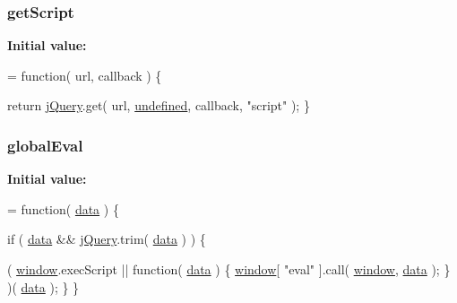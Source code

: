 \hypertarget{jquery-1_810_82-vsdoc_8js_abbf3713d0b4ae50a921583a6932e4c71}{
\subsubsection[{get\-Script}]{ get\-Script}}\label{jquery-1_810_82-vsdoc_8js_abbf3713d0b4ae50a921583a6932e4c71}
{\bfseries Initial value\-:}
\begin{DoxyCode}
= \textcolor{keyword}{function}( url, callback ) \{


        \textcolor{keywordflow}{return} \hyperlink{jquery-1_810_82-vsdoc_8js_add5237586d970a38a81f990e8eb28c6c}{jQuery}.get( url, \hyperlink{jquery-1_810_82-vsdoc_8js_a08113a236cc18d2a9d5ce27e638012be}{undefined}, callback, \textcolor{stringliteral}{"script"} );
    \}
\end{DoxyCode}
\hypertarget{jquery-1_810_82-vsdoc_8js_a898e1e411825feebc0c78978f2a2a140}{
\subsubsection[{global\-Eval}]{ global\-Eval}}\label{jquery-1_810_82-vsdoc_8js_a898e1e411825feebc0c78978f2a2a140}
{\bfseries Initial value\-:}
\begin{DoxyCode}
= \textcolor{keyword}{function}( \hyperlink{jquery-1_810_82-vsdoc_8js_a609407b3456fdc3c5671a9fc4a226ff7}{data} ) \{


        \textcolor{keywordflow}{if} ( \hyperlink{jquery-1_810_82-vsdoc_8js_a609407b3456fdc3c5671a9fc4a226ff7}{data} && \hyperlink{jquery-1_810_82-vsdoc_8js_add5237586d970a38a81f990e8eb28c6c}{jQuery}.trim( \hyperlink{jquery-1_810_82-vsdoc_8js_a609407b3456fdc3c5671a9fc4a226ff7}{data} ) ) \{
            
            
            
            ( \hyperlink{jquery-1_810_82-vsdoc_8js_a04a8a2bbfa9c15500892b8e5033d625b}{window}.execScript || \textcolor{keyword}{function}( \hyperlink{jquery-1_810_82-vsdoc_8js_a609407b3456fdc3c5671a9fc4a226ff7}{data} ) \{
                \hyperlink{jquery-1_810_82-vsdoc_8js_a04a8a2bbfa9c15500892b8e5033d625b}{window}[ \textcolor{stringliteral}{"eval"} ].call( \hyperlink{jquery-1_810_82-vsdoc_8js_a04a8a2bbfa9c15500892b8e5033d625b}{window}, \hyperlink{jquery-1_810_82-vsdoc_8js_a609407b3456fdc3c5671a9fc4a226ff7}{data} );
            \} )( \hyperlink{jquery-1_810_82-vsdoc_8js_a609407b3456fdc3c5671a9fc4a226ff7}{data} );
        \}
    \}
\end{DoxyCode}
